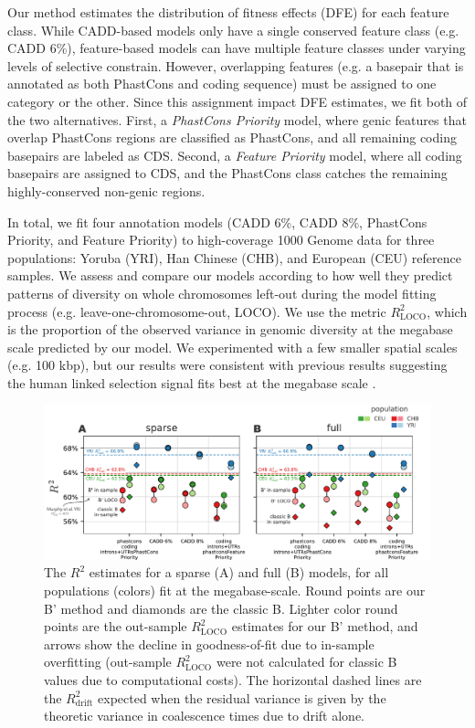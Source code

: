 \documentclass[11pt]{article}
\begin{document}
Our method estimates the distribution of fitness effects (DFE) for each feature
class. While CADD-based models only have a single conserved feature class (e.g.
CADD 6\%), feature-based models can have multiple feature classes under varying
levels of selective constrain. However, overlapping features (e.g. a basepair
that is annotated as both PhastCons and coding sequence) must be assigned to
one category or the other. Since this assignment impact DFE estimates, we fit
both of the two alternatives. First, a \emph{PhastCons Priority} model, where
genic features that overlap PhastCons regions are classified as PhastCons, and
all remaining coding basepairs are labeled as CDS. Second, a \emph{Feature
Priority} model, where all coding basepairs are assigned to CDS, and the
PhastCons class catches the remaining highly-conserved non-genic regions. 

In total, we fit four annotation models (CADD 6\%, CADD 8\%, PhastCons
Priority, and Feature Priority) to high-coverage 1000 Genome data for three
populations: Yoruba (YRI), Han Chinese (CHB), and European (CEU) reference
samples. We assess and compare our models according to how well they predict
patterns of diversity on whole chromosomes left-out during the model fitting
process (e.g. leave-one-chromosome-out, LOCO). We use the metric
$R_\text{LOCO}^2$, which is the proportion of the observed variance in genomic
diversity at the megabase scale predicted by our model. We experimented with a
few smaller spatial scales (e.g. 100 kbp), but our results were consistent with
previous results suggesting the human linked selection signal fits best at the
megabase scale \parencite{Murphy2022-sj}.

\begin{figure}[htbp] \centering
    \includegraphics[width=\textwidth]{figures/figure_2.pdf} 
    \caption{The $R^2$ estimates for a sparse (A) and full (B) models, for all 
    populations (colors) fit at the megabase-scale. Round points are our B' 
    method and diamonds are the classic B. Lighter color round points are
    the out-sample $R_\text{LOCO}^2$ estimates for our B' method, and arrows show the decline
    in goodness-of-fit due to in-sample overfitting (out-sample $R_\text{LOCO}^2$ 
    were not calculated for classic B values due to computational costs). The 
    horizontal dashed lines are the $R_\text{drift}^2$ expected when the residual
    variance is given by the theoretic variance in coalescence times due to drift alone.}
  \label{fig:figure-2}
\end{figure}
\end{document}
